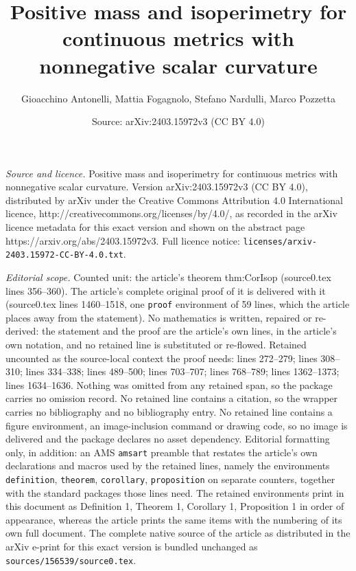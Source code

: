 \documentclass[10pt,a4paper]{amsart}
\title{Positive mass and isoperimetry for continuous metrics with nonnegative scalar curvature}
\author{Gioacchino Antonelli, Mattia Fogagnolo, Stefano Nardulli, Marco Pozzetta}
\date{Source: arXiv:2403.15972v3 (CC BY 4.0)}
\begin{document}
\maketitle

\noindent\emph{Source and licence.} Positive mass and isoperimetry for continuous metrics with nonnegative scalar curvature. Version arXiv:2403.15972v3 (CC BY 4.0), distributed by arXiv under the Creative Commons Attribution 4.0 International licence, http://creativecommons.org/licenses/by/4.0/, as recorded in the arXiv licence metadata for this exact version and shown on the abstract page https://arxiv.org/abs/2403.15972v3. Full licence notice: \texttt{licenses/arxiv-2403.15972-CC-BY-4.0.txt}.\par\smallskip

\noindent\textit{Editorial scope.} Counted unit: the article's theorem thm:CorIsop (source0.tex lines 356--360). The article's complete original proof of it is delivered with it (source0.tex lines 1460--1518, one \texttt{proof} environment of 59 lines, which the article places away from the statement). No mathematics is written, repaired or re-derived: the statement and the proof are the article's own lines, in the article's own notation, and no retained line is substituted or re-flowed.  Retained uncounted as the source-local context the proof needs: lines 272--279; lines 308--310; lines 334--338; lines 489--500; lines 703--707; lines 768--789; lines 1362--1373; lines 1634--1636.  Nothing was omitted from any retained span, so the package carries no omission record.  No retained line contains a citation, so the wrapper carries no bibliography and no bibliography entry.  No retained line contains a figure environment, an image-inclusion command or drawing code, so no image is delivered and the package declares no asset dependency.  Editorial formatting only, in addition: an AMS \texttt{amsart} preamble that restates the article's own declarations and macros used by the retained lines, namely the environments \texttt{definition}, \texttt{theorem}, \texttt{corollary}, \texttt{proposition} on separate counters, together with the standard packages those lines need.  The retained environments print in this document as Definition 1, Theorem 1, Corollary 1, Proposition 1 in order of appearance, whereas the article prints the same items with the numbering of its own full document.  The complete native source of the article as distributed in the arXiv e-print for this exact version is bundled unchanged as \texttt{sources/156539/source0.tex}.
\end{document}
